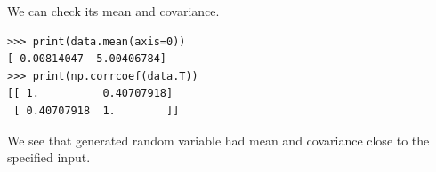 \documentclass[10pt]{book}
\begin{document}
{We can check its mean and covariance.
\beforeverb \begin{verbatim}
>>> print(data.mean(axis=0))
[ 0.00814047  5.00406784]
>>> print(np.corrcoef(data.T))
[[ 1.          0.40707918]
 [ 0.40707918  1.        ]]
\end{verbatim} \afterverb
We see that generated random variable had mean and covariance close to the specified input. 


%
%
%
%
%

}
\end{document}
